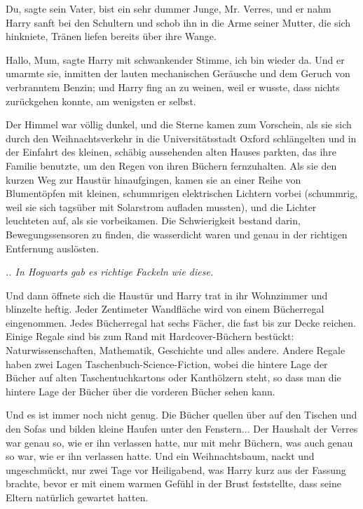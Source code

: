 \glqq{}Du\grqq{}, sagte sein Vater, \glqq{}bist ein sehr dummer Junge, Mr.
Verres\grqq{}, und er nahm Harry sanft bei den Schultern und schob ihn in die
Arme seiner Mutter, die sich hinkniete, Tränen liefen bereits über ihre Wange.

\glqq{}Hallo, Mum\grqq{}, sagte Harry mit schwankender Stimme, \glqq{}ich bin
wieder da.\grqq{} Und er umarmte sie, inmitten der lauten mechanischen Geräusche und
dem Geruch von verbranntem Benzin; und Harry fing an zu weinen, weil er wusste,
dass nichts zurückgehen konnte, am wenigsten er selbst.

Der Himmel war völlig dunkel, und die Sterne kamen zum Vorschein, als sie sich
durch den Weihnachtsverkehr in die Universitätsstadt Oxford schlängelten und in
der Einfahrt des kleinen, schäbig aussehenden alten Hauses parkten, das ihre
Familie benutzte, um den Regen von ihren Büchern fernzuhalten. Als sie den
kurzen Weg zur Haustür hinaufgingen, kamen sie an einer Reihe von Blumentöpfen
mit kleinen, schummrigen elektrischen Lichtern vorbei (schummrig, weil sie sich
tagsüber mit Solarstrom aufladen mussten), und die Lichter leuchteten auf, als
sie vorbeikamen. Die Schwierigkeit bestand darin, Bewegungssensoren zu finden,
die wasserdicht waren und genau in der richtigen Entfernung auslösten.

\emph{.. In Hogwarts gab es richtige Fackeln wie diese.}

Und dann öffnete sich die Haustür und Harry trat in ihr Wohnzimmer und blinzelte
heftig. Jeder Zentimeter Wandfläche wird von einem Bücherregal eingenommen.
Jedes Bücherregal hat sechs Fächer, die fast bis zur Decke reichen. Einige
Regale sind bis zum Rand mit Hardcover-Büchern bestückt: Naturwissenschaften,
Mathematik, Geschichte und alles andere. Andere Regale haben zwei Lagen
Taschenbuch-Science-Fiction, wobei die hintere Lage der Bücher auf alten
Taschentuchkartons oder Kanthölzern steht, so dass man die hintere Lage der
Bücher über die vorderen Bücher sehen kann.

Und es ist immer noch nicht genug. Die Bücher quellen über auf den Tischen und
den Sofas und bilden kleine Haufen unter den Fenstern... Der Haushalt der Verres
war genau so, wie er ihn verlassen hatte, nur mit mehr Büchern, was auch genau
so war, wie er ihn verlassen hatte. Und ein Weihnachtsbaum, nackt und
ungeschmückt, nur zwei Tage vor Heiligabend, was Harry kurz aus der Fassung
brachte, bevor er mit einem warmen Gefühl in der Brust feststellte, dass seine
Eltern natürlich gewartet hatten.

